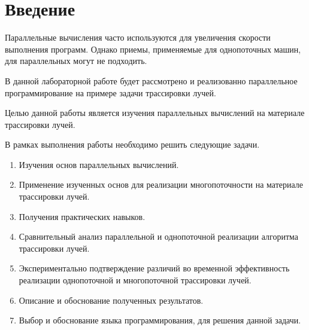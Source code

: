 \newpage
\chapter*{Введение}
Параллельные вычисления часто используются для увеличения скорости выполнения
программ. Однако приемы, применяемые для однопоточных машин, для
параллельных могут не подходить.

В данной лабораторной работе будет рассмотрено и реализованно параллельное
программирование на примере задачи трассировки лучей.

Целью данной работы является изучения параллельных вычислений на материале
трассировки лучей.

В рамках выполнения работы необходимо решить следующие задачи.

\begin{enumerate}
	\item Изучения основ параллельных вычислений.
	\item Применение изученных основ для реализации многопоточности на материале трассировки лучей.
	\item Получения практических навыков.
	\item Сравнительный анализ параллельной и однопоточной реализации алгоритма трассировки лучей.
	\item Экспериментально подтверждение различий во временной эффективность реализации однопоточной и многопоточной трассировки лучей.
	\item Описание и обоснование полученных результатов.
	\item Выбор и обоснование языка программирования, для решения данной задачи.
\end{enumerate}